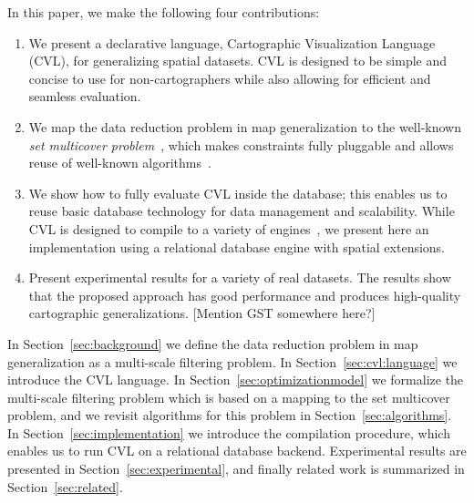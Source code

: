 In this paper, we make the following four contributions:
\begin{enumerate}
\item We present a declarative language, Cartographic Visualization Language (CVL), for generalizing spatial datasets. CVL is designed to be simple and concise to use for non-cartographers while also allowing for efficient and seamless evaluation.

\item We map the data reduction problem in map generalization to the well-known \emph{set multicover problem}~\cite{rajagopalan1998primal}, which makes constraints fully pluggable and allows reuse of well-known algorithms~\cite{rajagopalan1998primal,vazirani2001approximation}.

\item We show how to fully evaluate CVL inside the database; this enables us to reuse basic database technology for data management and scalability. While CVL is designed to compile to a variety of engines~\cite{dean04mapreduce}, we present here an implementation using a relational database engine with spatial extensions.

\item Present experimental results for a variety of real datasets. The results show that the proposed approach has good performance and produces high-quality cartographic generalizations. [Mention GST somewhere here?] 
\end{enumerate}

In Section~\ref{sec:background} we define the data reduction problem in map generalization as a multi-scale filtering problem. In Section~\ref{sec:cvl:language} we introduce the CVL language. In Section~\ref{sec:optimizationmodel} we formalize the multi-scale filtering problem which is based on a mapping to the set multicover problem, and we revisit algorithms for this problem in Section~\ref{sec:algorithms}. In Section~\ref{sec:implementation} we introduce the compilation procedure, which enables us to run CVL on a relational database backend. Experimental results are presented in Section~\ref{sec:experimental}, and finally related work is summarized in Section~\ref{sec:related}.
